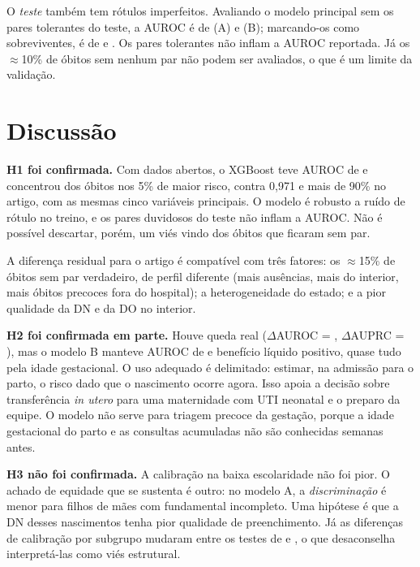 \documentclass[12pt]{article}
\begin{document}
O \emph{teste} também tem rótulos imperfeitos. Avaliando o modelo principal sem os pares tolerantes do teste, a AUROC é de \testeEstrAAuroc{} (A) e \testeEstrBAuroc{} (B); marcando-os como sobreviventes, é de \testeZeroAAuroc{} e \testeZeroBAuroc{}. Os pares tolerantes não inflam a AUROC reportada. Já os $\approx$10\% de óbitos sem nenhum par não podem ser avaliados, o que é um limite da validação.

\section{Discussão}

\textbf{H1 foi confirmada.} Com dados abertos, o XGBoost teve AUROC de \AXgbAuroc{} e concentrou \AXgbTop{} dos óbitos nos 5\% de maior risco, contra 0,971 e mais de 90\% no artigo, com as mesmas cinco variáveis principais. O modelo é robusto a ruído de rótulo no treino, e os pares duvidosos do teste não inflam a AUROC. Não é possível descartar, porém, um viés vindo dos óbitos que ficaram sem par.

A diferença residual para o artigo é compatível com três fatores: os $\approx$15\% de óbitos sem par verdadeiro, de perfil diferente (mais ausências, mais do interior, mais óbitos precoces fora do hospital); a heterogeneidade do estado; e a pior qualidade da DN e da DO no interior.

\textbf{H2 foi confirmada em parte.} Houve queda real ($\Delta$AUROC = \dAB{}, $\Delta$AUPRC = \dABprc{}), mas o modelo B manteve AUROC de \BXgbAuroc{} e benefício líquido positivo, quase tudo pela idade gestacional. O uso adequado é delimitado: estimar, na admissão para o parto, o risco dado que o nascimento ocorre agora. Isso apoia a decisão sobre transferência \emph{in utero} para uma maternidade com UTI neonatal e o preparo da equipe. O modelo não serve para triagem precoce da gestação, porque a idade gestacional do parto e as consultas acumuladas não são conhecidas semanas antes.

\textbf{H3 não foi confirmada.} A calibração na baixa escolaridade não foi pior. O achado de equidade que se sustenta é outro: no modelo A, a \emph{discriminação} é menor para filhos de mães com fundamental incompleto. Uma hipótese é que a DN desses nascimentos tenha pior qualidade de preenchimento. Já as diferenças de calibração por subgrupo mudaram entre os testes de \anoTesteAnt{} e \anoTeste{}, o que desaconselha interpretá-las como viés estrutural.
\end{document}
